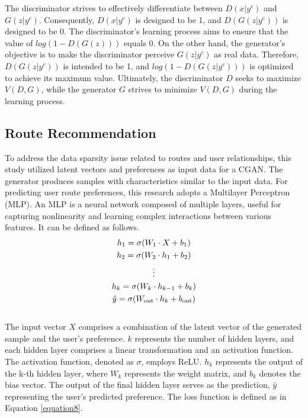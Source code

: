 \documentclass[]{article}
\begin{document}
The discriminator strives to effectively differentiate between $D(x|y^c)$ and $G(z|y^c)$. Consequently, $D(x|y^c)$ is designed to be 1, and $D(G(z|y^c))$ is designed to be 0. The discriminator's learning process aims to ensure that the value of $log(1 - D(G(z)))$ equals 0. On the other hand, the generator's objective is to make the discriminator perceive $G(z|y^c)$ as real data. Therefore, $D(G(z|y^c))$ is intended to be 1, and $log(1 - D(G(z|y^c)))$ is optimized to achieve its maximum value. Ultimately, the discriminator $D$ seeks to maximize $V(D, G)$, while the generator $G$ strives to minimize $V(D, G)$ during the learning process.


\subsection{Route Recommendation}
To address the data sparsity issue related to routes and user relationships, this study utilized latent vectors and preferences as input data for a CGAN. The generator produces samples with characteristics similar to the input data. For predicting user route preferences, this research adopts a Multilayer Perceptron (MLP). An MLP is a neural network composed of multiple layers, useful for capturing nonlinearity and learning complex interactions between various features. It can be defined as follows.\\
\begin{equation}
	\centering
	\begin{gathered}
		h_1 =\sigma(W_1 \cdot X + b_1) \\
		h_2 =\sigma(W_2 \cdot h_1 + b_2) \\
		\vdots \\
		h_k =\sigma(W_k \cdot h_{k-1} + b_k) \\
		\hat{y} =\sigma(W_{\text{out}} \cdot h_k + b_{\text{out}})
	\end{gathered}
\end{equation}
\\
The input vector $X$ comprises a combination of the latent vector of the generated sample and the user's preference. $k$ represents the number of hidden layers, and each hidden layer comprises a linear transformation and an activation function. The activation function, denoted as $σ$, employs ReLU. $h_k$ represents the output of the k-th hidden layer, where $W_k$ represents the weight matrix, and $b_k$ denotes the bias vector. The output of the final hidden layer serves as the prediction, \(\hat{y}\) representing the user's predicted preference. The loss function is defined as in Equation \ref{equation8}.\\
\end{document}
